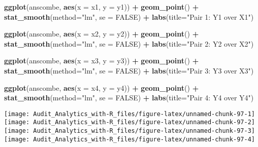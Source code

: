 \documentclass[
]{book}
\newenvironment{Shaded}{\begin{snugshade}}{\end{snugshade}}
\newcommand{\DataTypeTok}[1]{\textcolor[rgb]{0.13,0.29,0.53}{#1}}
\newcommand{\KeywordTok}[1]{\textcolor[rgb]{0.13,0.29,0.53}{\textbf{#1}}}
\newcommand{\NormalTok}[1]{#1}
\newcommand{\OperatorTok}[1]{\textcolor[rgb]{0.81,0.36,0.00}{\textbf{#1}}}
\newcommand{\OtherTok}[1]{\textcolor[rgb]{0.56,0.35,0.01}{#1}}
\newcommand{\StringTok}[1]{\textcolor[rgb]{0.31,0.60,0.02}{#1}}
\begin{document}
\begin{Shaded}
\begin{Highlighting}[]
\KeywordTok{ggplot}\NormalTok{(anscombe, }\KeywordTok{aes}\NormalTok{(}\DataTypeTok{x =}\NormalTok{ x1, }\DataTypeTok{y =}\NormalTok{ y1)) }\OperatorTok{+}\StringTok{ }
\StringTok{  }\KeywordTok{geom_point}\NormalTok{() }\OperatorTok{+}\StringTok{ }
\StringTok{  }\KeywordTok{stat_smooth}\NormalTok{(}\DataTypeTok{method=}\StringTok{"lm"}\NormalTok{, }\DataTypeTok{se =} \OtherTok{FALSE}\NormalTok{) }\OperatorTok{+}
\StringTok{  }\KeywordTok{labs}\NormalTok{(}\DataTypeTok{title=}\StringTok{"Pair 1: Y1 over X1"}\NormalTok{)}

\KeywordTok{ggplot}\NormalTok{(anscombe, }\KeywordTok{aes}\NormalTok{(}\DataTypeTok{x =}\NormalTok{ x2, }\DataTypeTok{y =}\NormalTok{ y2)) }\OperatorTok{+}\StringTok{ }
\StringTok{  }\KeywordTok{geom_point}\NormalTok{() }\OperatorTok{+}\StringTok{ }
\StringTok{  }\KeywordTok{stat_smooth}\NormalTok{(}\DataTypeTok{method=}\StringTok{"lm"}\NormalTok{, }\DataTypeTok{se =} \OtherTok{FALSE}\NormalTok{) }\OperatorTok{+}
\StringTok{  }\KeywordTok{labs}\NormalTok{(}\DataTypeTok{title=}\StringTok{"Pair 2: Y2 over X2"}\NormalTok{)}

\KeywordTok{ggplot}\NormalTok{(anscombe, }\KeywordTok{aes}\NormalTok{(}\DataTypeTok{x =}\NormalTok{ x3, }\DataTypeTok{y =}\NormalTok{ y3)) }\OperatorTok{+}\StringTok{ }
\StringTok{  }\KeywordTok{geom_point}\NormalTok{() }\OperatorTok{+}\StringTok{ }
\StringTok{  }\KeywordTok{stat_smooth}\NormalTok{(}\DataTypeTok{method=}\StringTok{"lm"}\NormalTok{, }\DataTypeTok{se =} \OtherTok{FALSE}\NormalTok{) }\OperatorTok{+}
\StringTok{  }\KeywordTok{labs}\NormalTok{(}\DataTypeTok{title=}\StringTok{"Pair 3: Y3 over X3"}\NormalTok{)}

\KeywordTok{ggplot}\NormalTok{(anscombe, }\KeywordTok{aes}\NormalTok{(}\DataTypeTok{x =}\NormalTok{ x4, }\DataTypeTok{y =}\NormalTok{ y4)) }\OperatorTok{+}\StringTok{ }
\StringTok{  }\KeywordTok{geom_point}\NormalTok{() }\OperatorTok{+}\StringTok{ }
\StringTok{  }\KeywordTok{stat_smooth}\NormalTok{(}\DataTypeTok{method=}\StringTok{"lm"}\NormalTok{, }\DataTypeTok{se =} \OtherTok{FALSE}\NormalTok{) }\OperatorTok{+}
\StringTok{  }\KeywordTok{labs}\NormalTok{(}\DataTypeTok{title=}\StringTok{"Pair 4: Y4 over Y4"}\NormalTok{)}
\end{Highlighting}
\end{Shaded}

\texttt{[image: Audit\_Analytics\_with-R\_files/figure-latex/unnamed-chunk-97-1]} \texttt{[image: Audit\_Analytics\_with-R\_files/figure-latex/unnamed-chunk-97-2]} \texttt{[image: Audit\_Analytics\_with-R\_files/figure-latex/unnamed-chunk-97-3]} \texttt{[image: Audit\_Analytics\_with-R\_files/figure-latex/unnamed-chunk-97-4]}
\end{document}
